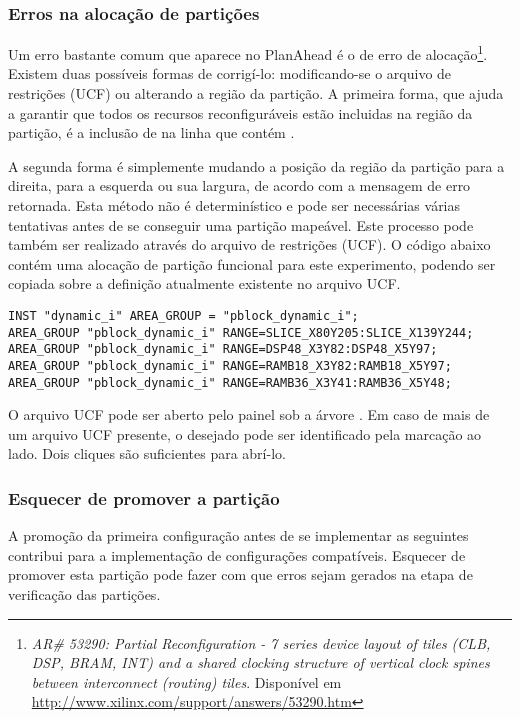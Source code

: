 \documentclass[11pt,a4paper,oneside]{book}
\begin{document}
\subsubsection{Erros na alocação de partições}
\label{par:alocacao}
Um erro bastante comum que aparece no PlanAhead é o de erro de alocação\footnote{\textit{AR\# 53290: Partial Reconfiguration - 7 series device layout of tiles (CLB, DSP, BRAM, INT) and a shared clocking structure of vertical clock spines between interconnect (routing) tiles}. Disponível em \url{http://www.xilinx.com/support/answers/53290.htm}}.
Existem duas possíveis formas de corrigí-lo: modificando-se o arquivo de restrições (UCF) ou alterando a região da partição.
A primeira forma, que ajuda a garantir que todos os recursos reconfiguráveis estão incluidas na região da partição, é a inclusão de  na linha que contém .

A segunda forma é simplemente mudando a posição da região da partição para a direita, para a esquerda ou sua largura, de acordo com a mensagem de erro retornada.
Esta método não é determinístico e pode ser necessárias várias tentativas antes de se conseguir uma partição mapeável. 
Este processo pode também ser realizado através do arquivo de restrições (UCF).
O código abaixo contém uma alocação de partição funcional para este experimento, podendo ser copiada sobre a definição atualmente existente no arquivo UCF.
\begin{lstlisting}
INST "dynamic_i" AREA_GROUP = "pblock_dynamic_i";
AREA_GROUP "pblock_dynamic_i" RANGE=SLICE_X80Y205:SLICE_X139Y244;
AREA_GROUP "pblock_dynamic_i" RANGE=DSP48_X3Y82:DSP48_X5Y97;
AREA_GROUP "pblock_dynamic_i" RANGE=RAMB18_X3Y82:RAMB18_X5Y97;
AREA_GROUP "pblock_dynamic_i" RANGE=RAMB36_X3Y41:RAMB36_X5Y48;
\end{lstlisting}

O arquivo UCF pode ser aberto pelo painel  sob a árvore .
Em caso de mais de um arquivo UCF presente, o desejado pode ser identificado pela marcação  ao lado.
Dois cliques são suficientes para abrí-lo. 

\subsubsection{Esquecer de promover a partição}
A promoção da primeira configuração antes de se implementar as seguintes contribui para a implementação de configurações compatíveis.
Esquecer de promover esta partição pode fazer com que erros sejam gerados na etapa de verificação das partições.
\end{document}
